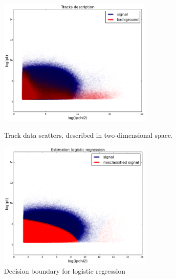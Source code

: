 \documentclass[a4paper]{jpconf}
\begin{document}
\begin{figure}[h]
\begin{minipage}{18pc}
\includegraphics[width=18pc]{../images/track-db}
\caption{\label{hlt1} Track data scatters, described in two-dimensional space.}
\end{minipage}\hspace{2pc}%
\begin{minipage}{18pc}
\includegraphics[width=18pc]{../images/log-track-db}
\caption{\label{hlt1log} Decision boundary for logistic regression}
\end{minipage} 

\end{figure}
\end{document}
